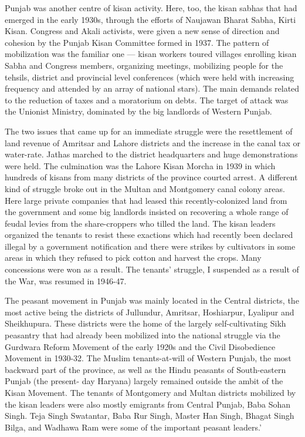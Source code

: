 Punjab was another centre of kisan activity. Here, too, the kisan sabhas that had emerged in the early 1930s, through the efforts of Naujawan Bharat Sabha, Kirti Kisan. Congress and Akali activists, were given a new sense of direction and cohesion by the Punjab Kisan Committee formed in 1937. The pattern of mobilization was the familiar one — kisan workers toured villages enrolling kisan Sabha and Congress members, organizing meetings, mobilizing people for the tehsils, district and provincial level conferences (which were held with increasing frequency and attended by an array of national stars). The main demands related to the reduction of taxes and a moratorium on debts. The target of attack was the Unionist Ministry, dominated by the big landlords of Western Punjab.

The two issues that came up for an immediate struggle were the resettlement of land revenue of Amritsar and Lahore districts and the increase in the canal tax or water-rate. Jathas marched to the district headquarters and huge demonstrations were held. The culmination was the Lahore Kisan Morcha in 1939 in which hundreds of kisans from many districts of the province courted arrest. A different kind of struggle broke out in the Multan and Montgomery canal colony areas. Here large private companies that had leased this recently-colonized land from the government and some big landlords insisted on recovering a whole range of feudal levies from the share-croppers who tilled the land. The kisan leaders organized the tenants to resist these exactions which had recently been declared illegal by a government notification and there were strikes by cultivators in some areas in which they refused to pick cotton and harvest the crops. Many concessions were won as a result. The tenants' struggle, I suspended as a result of the War, was resumed in 1946-47.

The peasant movement in Punjab was mainly located in the Central districts, the most active being the districts of Jullundur, Amritsar, Hoshiarpur, Lyalipur and Sheikhupura. These districts were the home of the largely self-cultivating Sikh peasantry that had already been mobilized into the national struggle via the Gurdwara Reform Movement of the early 1920s and the Civil Disobedience Movement in 1930-32. The Muslim tenants-at-will of Western Punjab, the most backward part of the province, as well as the Hindu peasants of South-eastern Punjab (the present- day Haryana) largely remained outside the ambit of the Kisan Movement. The tenants of Montgomery and Multan districts mobilized by the kisan leaders were also mostly emigrants from Central Punjab, Baba Sohan Singh. Teja Singh Swatantar, Baba Rur Singh, Master Han Singh, Bhagat Singh Bilga, and Wadhawa Ram were some of the important peasant leaders.'

